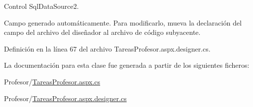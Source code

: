 Control Sql\+Data\+Source2. 

Campo generado automáticamente. Para modificarlo, mueva la declaración del campo del archivo del diseñador al archivo de código subyacente. 

Definición en la línea 67 del archivo Tareas\+Profesor.\+aspx.\+designer.\+cs.



La documentación para esta clase fue generada a partir de los siguientes ficheros\+:\begin{DoxyCompactItemize}
\item 
Profesor/\mbox{\hyperlink{TareasProfesor_8aspx_8cs}{Tareas\+Profesor.\+aspx.\+cs}}\item 
Profesor/\mbox{\hyperlink{TareasProfesor_8aspx_8designer_8cs}{Tareas\+Profesor.\+aspx.\+designer.\+cs}}\end{DoxyCompactItemize}
